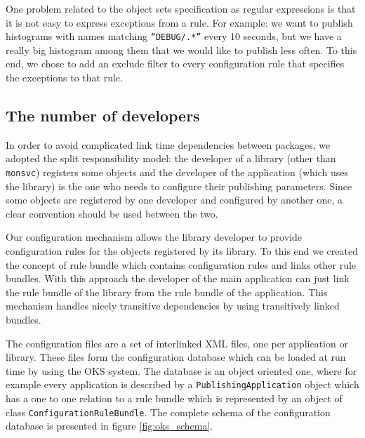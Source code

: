 One problem related to the object sets specification as regular expressions is that it is not easy to express exceptions from a rule. For example: we want to publish histograms with names matching {\tt “DEBUG/.*”} every 10 seconds, but we have a really big histogram among them that we would like to publish less often. To this end, we chose to add an exclude filter to every configuration rule that specifies the exceptions to that rule.

\subsection*{The number of developers}

In order to avoid complicated link time dependencies between packages, we adopted the split responsibility model: the developer of a library (other than {\tt monsvc}) registers some objects and the developer of the application (which uses the library) is the one who needs to configure their publishing parameters. Since some objects are registered by one developer and configured by another one, a clear convention should be used between the two. 

Our configuration mechanism allows the library developer to provide configuration rules for the objects registered by its library. To this end we created the concept of rule bundle which contains configuration rules and links other rule bundles. With this approach the developer of the main application can just link the rule bundle of the library from the rule bundle of the application. This mechanism handles nicely transitive dependencies by using transitively linked bundles.

The configuration files are a set of interlinked XML files, one per application or library. These files form the configuration database which can be loaded at run time by using the OKS system. The database is an object oriented one, where for example every application is described by a {\tt PublishingApplication} object which has a one to one relation to a rule bundle which is represented by an object of class {\tt ConfigurationRuleBundle}. The complete schema of the configuration database is presented in figure \ref{fig:oks_schema}. 

